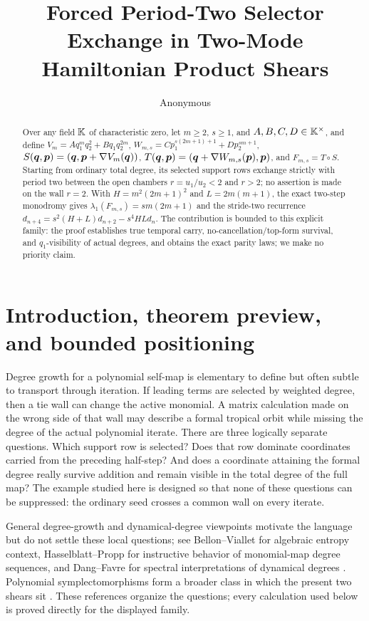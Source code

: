 \documentclass[11pt]{article}
\title{Forced Period-Two Selector Exchange in Two-Mode Hamiltonian Product Shears}
\author{Anonymous}
\date{}
\theoremstyle{definition}
\theoremstyle{remark}
\begin{document}
\maketitle

\begin{abstract}
Over any field \(\mathbb{K}\) of characteristic zero, let \(m\geq2\), \(s\geq1\),
and \(A,B,C,D\in\mathbb{K}^\times\), and define
\(V_m=Aq_1^m q_2^2+Bq_1q_2^{2m}\),
\(W_{m,s}=Cp_1^{s(2m+1)+1}+Dp_2^{sm+1}\),
\(S(\boldsymbol{q},\boldsymbol{p})=(\boldsymbol{q},\boldsymbol{p}+\nabla V_m(\boldsymbol{q}))\),
\(T(\boldsymbol{q},\boldsymbol{p})=(\boldsymbol{q}+\nabla W_{m,s}(\boldsymbol{p}),\boldsymbol{p})\), and
\(F_{m,s}=T\circ S\).  Starting from ordinary total degree, its selected
support rows exchange strictly with period two between the open chambers
\(r=u_1/u_2<2\) and \(r>2\); no assertion is made on the wall \(r=2\).
With \(H=m^2(2m+1)^2\) and \(L=2m(m+1)\), the exact two-step monodromy gives
\(\lambda_1(F_{m,s})=sm(2m+1)\) and the stride-two recurrence
\(d_{n+4}=s^2(H+L)d_{n+2}-s^4HLd_n\).  The contribution is bounded to this
explicit family: the proof establishes true temporal carry,
no-cancellation/top-form survival, and \(q_1\)-visibility of actual degrees,
and obtains the exact parity laws; we make no priority claim.
\end{abstract}

\section{Introduction, theorem preview, and bounded positioning}
\label{sec:introduction}

Degree growth for a polynomial self-map is elementary to define but often
subtle to transport through iteration.  If leading terms are selected by
weighted degree, then a tie wall can change the active monomial.  A matrix
calculation made on the wrong side of that wall may describe a formal
tropical orbit while missing the degree of the actual polynomial iterate.
There are three logically separate questions.  Which support row is selected?
Does that row dominate coordinates carried from the preceding half-step?
And does a coordinate attaining the formal degree really survive addition
and remain visible in the total degree of the full map?  The example studied
here is designed so that none of these questions can be suppressed: the
ordinary seed crosses a common wall on every iterate.

General degree-growth and dynamical-degree viewpoints motivate the language
but do not settle these local questions; see Bellon--Viallet for algebraic
entropy context, Hasselblatt--Propp for instructive behavior of monomial-map
degree sequences, and Dang--Favre for spectral interpretations of dynamical
degrees \citep{BellonVialletAlgebraicEntropy,HasselblattProppMonomialDegreeGrowth,DangFavreSpectralInterpretations}.
Polynomial symplectomorphisms form a broader class in which the present two
shears sit \citep{JaneczkoJelonekPolynomialSymplectomorphisms}.  These
references organize the questions; every calculation used below is proved
directly for the displayed family.
\end{document}
